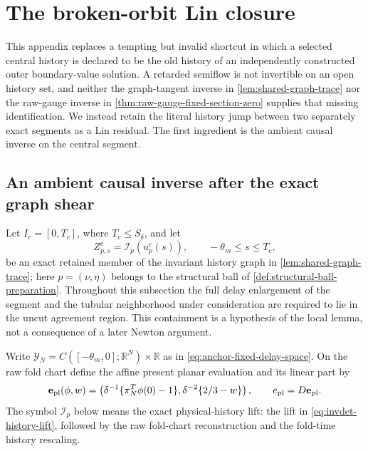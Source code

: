 \section{The broken-orbit Lin closure}
\label{sec:broken-lin-closure}

This appendix replaces a tempting but invalid shortcut in which a selected
central history is declared to be the old history of an independently
constructed outer boundary-value solution.  A retarded semiflow is not
invertible on an open history set, and neither the graph-tangent inverse in
\cref{lem:shared-graph-trace} nor the raw-gauge inverse in
\cref{thm:raw-gauge-fixed-section-zero} supplies that missing identification.
We instead retain the literal history jump between two separately exact
segments as a Lin residual.  The first ingredient is the ambient causal
inverse on the central segment.

\subsection{An ambient causal inverse after the exact graph shear}

Let \(I_c=[0,T_c]\), where \(T_c\le S_\delta\), and let
\begin{equation}
 Z^c_{p,s}=\mathcal I_p(u_p^c(s)),
 \qquad -\theta_m\le s\le T_c,                    \label{eq:anchor-central-exact-graph-member}
\end{equation}
be an exact retained member of the invariant history graph in
\cref{lem:shared-graph-trace}; here \(p=(\nu,\eta)\) belongs to the
structural ball of \cref{def:structural-ball-preparation}.  Throughout this
subsection the full delay enlargement of the segment and the tubular
neighborhood under consideration are required to lie in the uncut agreement
region.  This containment is a hypothesis of the local lemma, not a
consequence of a later Newton argument.

Write \(\mathscr Y_N=C([ -\theta_m,0];\mathbb R^N)\times\mathbb R\) as in
\cref{eq:anchor-fixed-delay-space}.  On the raw fold chart define the affine
present planar evaluation and its linear part by
\begin{equation}
 \mathbf e_{\rm pl}(\phi,w)
 =\left(\delta^{-1}\{\pi_N^T\phi(0)-1\},
        \delta^{-2}\{2/3-w\}\right),
 \qquad e_{\rm pl}=D\mathbf e_{\rm pl}.             \label{eq:anchor-central-planar-evaluation}
\end{equation}
The symbol \(\mathcal I_p\) below means the exact physical-history lift:
the lift in \cref{eq:invdet-history-lift}, followed by the raw fold-chart
reconstruction and the fold-time history rescaling.

